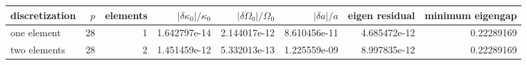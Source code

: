 \begin{tabular}{lrrrrrrr}
\hline
discretization & $p$ & elements & $|\delta\kappa_0|/\kappa_0$ & $|\delta\Omega_0|/\Omega_0$ & $|\delta a|/a$ & eigen residual & minimum eigengap \\
\hline
one element & 28 & 1 & 1.642797e-14 & 2.144017e-12 & 8.610456e-11 & 4.685472e-12 & 0.22289169 \\
two elements & 28 & 2 & 1.451459e-12 & 5.332013e-13 & 1.225559e-09 & 8.997835e-12 & 0.22289169 \\
\hline
\end{tabular}

